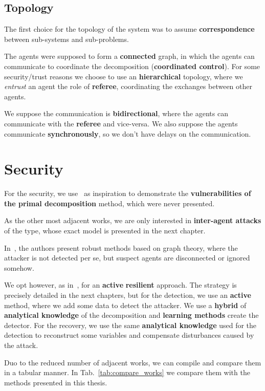 \documentclass[../main.tex]{subfiles}
\begin{document}
\subsection{Topology}\label{sec:decomposition_chosen}
The first choice for the topology of the system was to assume \textbf{correspondence} between sub-systems and sub-problems.

The agents were supposed to form a \textbf{connected} graph, in which the agents can communicate to coordinate the decomposition (\textbf{coordinated control}).
For some security/trust reasons we choose to use an \textbf{hierarchical} topology, where we \emph{entrust} an agent the role of \textbf{referee}, coordinating the exchanges between other agents.

We suppose the communication is \textbf{bidirectional}, where the agents can communicate with the \textbf{referee} and vice-versa.
We also suppose the agents communicate \textbf{synchronously}, so we don't have delays on the communication.

\section{Security}
For the security, we use~\cite{VelardeEtAl2017b,ChanfreutEtAl2018} as inspiration to demonstrate the \textbf{vulnerabilities of the primal decomposition} method, which were never presented.

As the other most adjacent works, we are only interested in \textbf{inter-agent attacks} of the \textbf{\fdi{}} type, whose exact model is presented in the next chapter.

In~\cite{VelardeEtAl2017a,VelardeEtAl2017b,VelardeEtAl2018}, the authors present robust methods based on graph theory, where the attacker is not detected per se, but suspect agents are disconnected or ignored somehow.

We opt however, as in~\cite{AnandutaEtAl2018,AnandutaEtAl2019,AnandutaEtAl2020},
for an \textbf{active} \textbf{resilient} approach.
The strategy is precisely detailed in the next chapters, but for the detection, we use an \textbf{active} method, where we add some data to detect the attacker.
We use a \textbf{hybrid} of \textbf{analytical knowledge} of the decomposition and \textbf{learning methods} create the detector.
For the recovery, we use the same \textbf{analytical knowledge} used for the detection to reconstruct some variables and compensate disturbances caused by the attack.

Duo to the reduced number of adjacent works, we can compile and compare them in a tabular manner.
In Tab.~\ref{tab:compare_works} we compare them with the methods presented in this thesis.
\end{document}

